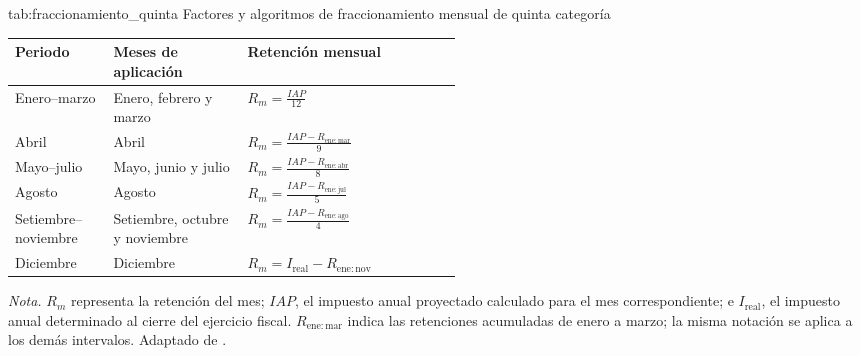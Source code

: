 \vspace{0.5cm}

\par\medskip
\noindent
\begin{minipage}{\linewidth}

    \tituloTablaAPA
        {tab:fraccionamiento_quinta}
        {Factores y algoritmos de fraccionamiento mensual de quinta categoría}

    \begingroup
    \renewcommand{\baselinestretch}{1}
    \small
    \setlength{\tabcolsep}{4pt}
    \renewcommand{\arraystretch}{1.6}

    \begin{tabularx}{\linewidth}{
        @{}
        >{\raggedright\arraybackslash}p{0.22\linewidth}
        >{\raggedright\arraybackslash}p{0.30\linewidth}
        >{\centering\arraybackslash}X
        @{}
    }
        \toprule
        \textbf{Periodo} &
        \textbf{Meses de aplicación} &
        \textbf{Retención mensual} \\
        \midrule

        Enero--marzo &
        Enero, febrero y marzo &
        \(\displaystyle R_m=\frac{IAP}{12}\) \\

        Abril &
        Abril &
        \(\displaystyle R_m=\frac{IAP-R_{\mathrm{ene:mar}}}{9}\) \\

        Mayo--julio &
        Mayo, junio y julio &
        \(\displaystyle R_m=\frac{IAP-R_{\mathrm{ene:abr}}}{8}\) \\

        Agosto &
        Agosto &
        \(\displaystyle R_m=\frac{IAP-R_{\mathrm{ene:jul}}}{5}\) \\

        Setiembre--noviembre &
        Setiembre, octubre y noviembre &
        \(\displaystyle R_m=\frac{IAP-R_{\mathrm{ene:ago}}}{4}\) \\

        Diciembre &
        Diciembre &
        \(R_m=I_{\mathrm{real}}-R_{\mathrm{ene:nov}}\) \\

        \bottomrule
    \end{tabularx}

    \vspace{0.2cm}

    \noindent
    \textit{Nota.} \(R_m\) representa la retención del mes; \(IAP\), 
    el impuesto anual proyectado calculado para el mes correspondiente; 
    e \(I_{\mathrm{real}}\), el impuesto anual determinado al cierre del ejercicio fiscal.
    \(R_{\mathrm{ene:mar}}\) indica las retenciones acumuladas de enero a marzo; la misma notación se aplica a los demás intervalos. Adaptado de \textcite{sunat2026quinta}.

    \par
    \endgroup

\end{minipage}
\par\medskip


